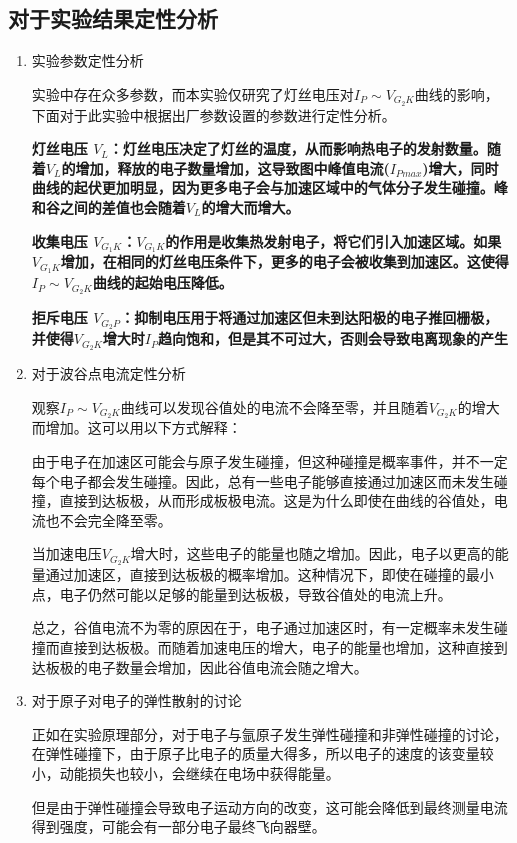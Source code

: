 \documentclass[dvipsnames, svgnames,a4paper,11pt]{article}
\begin{document}
	\subsection{对于实验结果定性分析}
	\begin{enumerate}
		\item 实验参数定性分析
		
		\quad \quad 实验中存在众多参数，而本实验仅研究了灯丝电压对$I_P{\sim}V_{G_2K}$曲线的影响，下面对于此实验中根据出厂参数设置的参数进行定性分析。

		\quad \quad \textbf{灯丝电压 $V_L$：灯丝电压决定了灯丝的温度，从而影响热电子的发射数量。随着$V_L$的增加，释放的电子数量增加，这导致图中峰值电流($I_{Pmax}$)增大，同时曲线的起伏更加明显，因为更多电子会与加速区域中的气体分子发生碰撞。峰和谷之间的差值也会随着$V_L$的增大而增大。}

		\quad \quad \textbf{收集电压 $V_{G_1K}$：$V_{G_1K}$的作用是收集热发射电子，将它们引入加速区域。如果$V_{G_1K}$增加，在相同的灯丝电压条件下，更多的电子会被收集到加速区。这使得$I_{P}{\sim}V_{G_{2}K}$曲线的起始电压降低。}

		\quad \quad \textbf{拒斥电压 $V_{G_2P}$：抑制电压用于将通过加速区但未到达阳极的电子推回栅极，并使得$V_{G_{2}K}$增大时$I_P$趋向饱和，但是其不可过大，否则会导致电离现象的产生}

		\item 对于波谷点电流定性分析
		
		\quad \quad 观察$I_P{\sim}V_{G_2K}$曲线可以发现谷值处的电流不会降至零，并且随着$V_{G_2K}$的增大而增加。这可以用以下方式解释：

		\quad \quad 由于电子在加速区可能会与原子发生碰撞，但这种碰撞是概率事件，并不一定每个电子都会发生碰撞。因此，总有一些电子能够直接通过加速区而未发生碰撞，直接到达板极，从而形成板极电流。这是为什么即使在曲线的谷值处，电流也不会完全降至零。

		\quad \quad 当加速电压$V_{G_2K}$增大时，这些电子的能量也随之增加。因此，电子以更高的能量通过加速区，直接到达板极的概率增加。这种情况下，即使在碰撞的最小点，电子仍然可能以足够的能量到达板极，导致谷值处的电流上升。

		\quad \quad 总之，谷值电流不为零的原因在于，电子通过加速区时，有一定概率未发生碰撞而直接到达板极。而随着加速电压的增大，电子的能量也增加，这种直接到达板极的电子数量会增加，因此谷值电流会随之增大。

		\item 对于原子对电子的弹性散射的讨论
	
		\quad \quad 正如在实验原理部分，对于电子与氩原子发生弹性碰撞和非弹性碰撞的讨论，在弹性碰撞下，由于原子比电子的质量大得多，所以电子的速度的该变量较小，动能损失也较小，会继续在电场中获得能量。

		\quad \quad 但是由于弹性碰撞会导致电子运动方向的改变，这可能会降低到最终测量电流得到强度，可能会有一部分电子最终飞向器壁。


	\end{enumerate}
	
\end{document}
